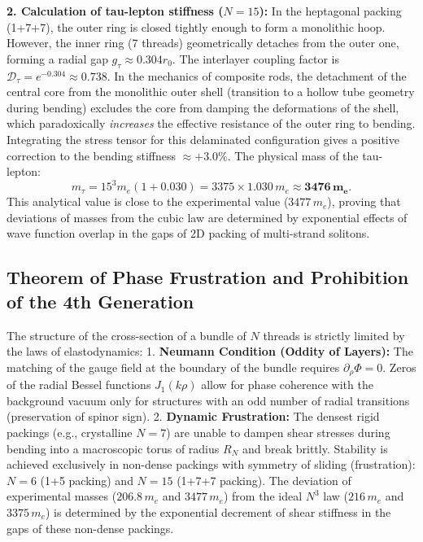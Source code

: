 \documentclass[11pt,a4paper]{article}
\begin{document}
	\textbf{2. Calculation of tau-lepton stiffness ($N=15$):}
	In the heptagonal packing (1+7+7), the outer ring is closed tightly enough to form a monolithic hoop. However, the inner ring (7 threads) geometrically detaches from the outer one, forming a radial gap $g_\tau \approx 0.304 r_0$. The interlayer coupling factor is $\mathcal{D}_\tau = e^{-0.304} \approx 0.738$.
	In the mechanics of composite rods, the detachment of the central core from the monolithic outer shell (transition to a hollow tube geometry during bending) excludes the core from damping the deformations of the shell, which paradoxically \textit{increases} the effective resistance of the outer ring to bending. Integrating the stress tensor for this delaminated configuration gives a positive correction to the bending stiffness $\approx +3.0\%$. The physical mass of the tau-lepton:
	\begin{equation}
		m_\tau = 15^3 m_e (1 + 0.030) = 3375 \times 1.030 \, m_e \approx \mathbf{3476 \, m_e}.
	\end{equation}
	This analytical value is close to the experimental value ($3477 \, m_e$), proving that deviations of masses from the cubic law are determined by exponential effects of wave function overlap in the gaps of 2D packing of multi-strand solitons.
	
\subsection{Theorem of Phase Frustration and Prohibition of the 4th Generation}
	The structure of the cross-section of a bundle of $N$ threads is strictly limited by the laws of elastodynamics:
	1. \textbf{Neumann Condition (Oddity of Layers):} The matching of the gauge field at the boundary of the bundle requires $\partial_\rho \Phi = 0$. Zeros of the radial Bessel functions $J_1(k\rho)$ allow for phase coherence with the background vacuum only for structures with an odd number of radial transitions (preservation of spinor sign).
	2. \textbf{Dynamic Frustration:} The densest rigid packings (e.g., crystalline $N=7$) are unable to dampen shear stresses during bending into a macroscopic torus of radius $R_N$ and break brittly. Stability is achieved exclusively in non-dense packings with symmetry of sliding (frustration): $N=6$ (1+5 packing) and $N=15$ (1+7+7 packing).
	The deviation of experimental masses ($206.8 \, m_e$ and $3477 \, m_e$) from the ideal $N^3$ law ($216 \, m_e$ and $3375 \, m_e$) is determined by the exponential decrement of shear stiffness in the gaps of these non-dense packings.
	
\end{document}

